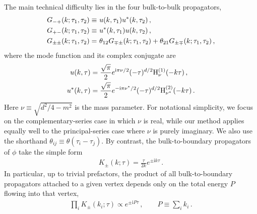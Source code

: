 \documentclass[%
 reprint,
 amsmath,amssymb,
 aps,
prd,
]{revtex4-2}
\def\ii{\mathrm{i}}
\begin{document}
The main technical difficulty lies in the four bulk-to-bulk propagators,
\begin{align}
G_{-+}(k;\tau_1,\tau_2)\equiv&~u(k,\tau_1)u^*(k,\tau_2)\,, \notag\\
G_{+-}(k;\tau_1,\tau_2)\equiv&~u^*(k,\tau_1)u(k,\tau_2)\,, \notag\\
G_{\pm\pm}(k;\tau_1,\tau_2)=&~\theta_{12}G_{\mp\pm}(k;\tau_1,\tau_2)
+\theta_{21}G_{\pm\mp}(k;\tau_1,\tau_2)\,,
\label{eq:proptype}
\end{align}
where the mode function and its complex conjugate are
\begin{align}
u(k,\tau)&=\frac{\sqrt\pi}{2}e^{\ii\pi \nu/2}(-\tau)^{d/2}\mathrm H_{\nu}^{(1)}(-k\tau)\,, \notag\\
u^*(k,\tau)&=\frac{\sqrt\pi}{2}e^{-\ii\pi \nu^*/2}(-\tau)^{d/2}\mathrm H_{\nu^*}^{(2)}(-k\tau)\,.
\end{align}
Here \(\nu\equiv\sqrt{d^2/4-m^2}\) is the mass parameter. For notational simplicity, we focus on the complementary-series case in which \(\nu\) is real, while our method applies equally well to the principal-series case where \(\nu\) is purely imaginary. We also use the shorthand \(\theta_{ij}\equiv\theta(\tau_i-\tau_j)\). By contrast, the bulk-to-boundary propagators of \(\phi\) take the simple form
\begin{align}
K_\pm(k;\tau)= \frac{\tau}{2k}e^{\pm \ii k\tau}\,.
\end{align}
In particular, up to trivial prefactors, the product of all bulk-to-boundary propagators attached to a given vertex depends only on the total energy \(P\) flowing into that vertex,
\begin{align}
\prod_i K_\pm(k_i;\tau)\propto e^{\pm \ii P\tau}\,,\qquad
P\equiv \sum_i k_i\,.
\end{align}
\end{document}
